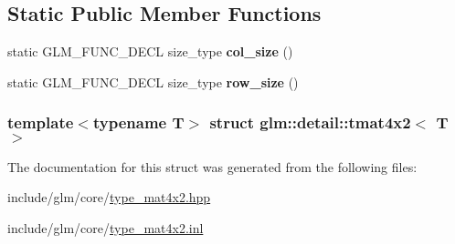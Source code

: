 \subsection*{\-Static \-Public \-Member \-Functions}
\begin{DoxyCompactItemize}
\item 
\hypertarget{structglm_1_1detail_1_1tmat4x2_a94ced6676f6709e4b71412eb27d19802}{static \-G\-L\-M\-\_\-\-F\-U\-N\-C\-\_\-\-D\-E\-C\-L size\-\_\-type {\bfseries col\-\_\-size} ()}\label{structglm_1_1detail_1_1tmat4x2_a94ced6676f6709e4b71412eb27d19802}

\item 
\hypertarget{structglm_1_1detail_1_1tmat4x2_aa505db7165ff6eae50386db0f4b8e435}{static \-G\-L\-M\-\_\-\-F\-U\-N\-C\-\_\-\-D\-E\-C\-L size\-\_\-type {\bfseries row\-\_\-size} ()}\label{structglm_1_1detail_1_1tmat4x2_aa505db7165ff6eae50386db0f4b8e435}

\end{DoxyCompactItemize}
\subsubsection*{template$<$typename \-T$>$ struct glm\-::detail\-::tmat4x2$<$ T $>$}



\-The documentation for this struct was generated from the following files\-:\begin{DoxyCompactItemize}
\item 
include/glm/core/\hyperlink{type__mat4x2_8hpp}{type\-\_\-mat4x2.\-hpp}\item 
include/glm/core/\hyperlink{type__mat4x2_8inl}{type\-\_\-mat4x2.\-inl}\end{DoxyCompactItemize}
